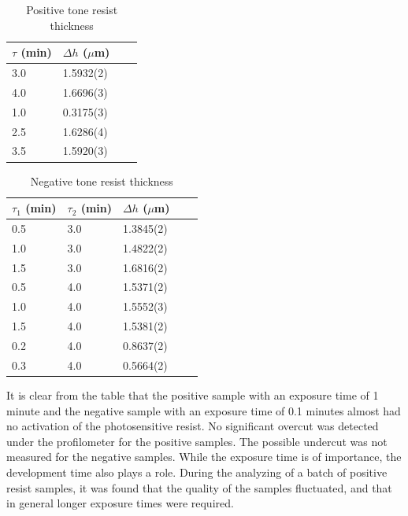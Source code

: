 \begin{table}[H]
    \centering
    \caption{Positive tone resist thickness}
    \begin{tabular}{X l l l}
        $\tau$ (min)& $\Delta h$ ($\mu$m) \\ 
        \hline\hline
        3.0 & 1.5932(2) \\
        4.0 & 1.6696(3) \\
        1.0 & 0.3175(3) \\
        2.5 & 1.6286(4) \\
        3.5 & 1.5920(3) \\
        \hline
    \end{tabular}
    \label{tab:pos_profile}
\end{table}

\begin{table}[H]
    \centering
    \caption{Negative tone resist thickness}
    \begin{tabular}{X l l l l}
	$\tau_1$ (min) & $\tau_2$ (min) & $\Delta h$ ($\mu$m) \\ 
        \hline\hline
        0.5 & 3.0 & 1.3845(2) \\
        1.0 & 3.0 & 1.4822(2) \\
        1.5 & 3.0 & 1.6816(2)  \\
        0.5 & 4.0 & 1.5371(2)  \\
        1.0 & 4.0 & 1.5552(3)  \\
        1.5 & 4.0 & 1.5381(2)  \\
        0.2 & 4.0 & 0.8637(2)  \\
        0.3 & 4.0 & 0.5664(2)  \\
        \hline
    \end{tabular}
    \label{tab:neg_profile}
\end{table}

It is clear from the table that the positive sample with an exposure time of  1 minute and the negative sample with an exposure time of 0.1 minutes almost had no activation of the photosensitive resist. No significant overcut was detected under the profilometer for the positive samples. The possible undercut was not measured for the negative samples.
While the exposure time is of importance, the development time also plays a role. During the analyzing of a batch of positive resist samples, it was found that the quality of the samples fluctuated, and that in general longer exposure times were required. 


